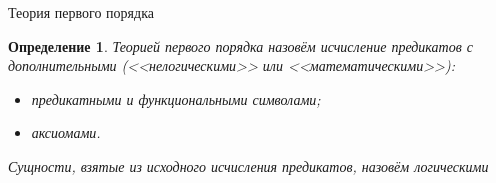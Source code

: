 \documentclass[aspectratio=169]{beamer}
\newtheorem{dfn}{Определение}[section]
\begin{document}
\newcommand\doubleplus{+\kern-1.3ex+\kern0.8ex}
\newcommand\mdoubleplus{\ensuremath{\mathbin{+\mkern-10mu+}}}

\begin{frame}{Теория первого порядка}
\begin{dfn}
Теорией первого порядка назовём исчисление предикатов с дополнительными (<<нелогическими>>
или <<математическими>>):
\begin{itemize}
\item предикатными и функциональными символами;
\item аксиомами.
\end{itemize}

Сущности, взятые из исходного исчисления предикатов, назовём \emph{логическими}
\end{dfn}
\end{frame}
\end{document}
